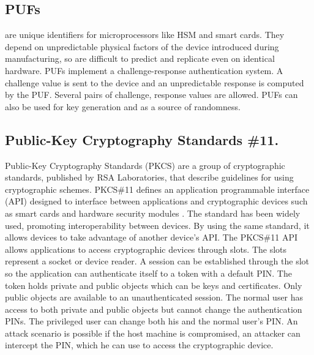 \subsection{PUFs} are unique identifiers for microprocessors like HSM and smart cards. They depend on unpredictable physical factors of the device introduced during manufacturing, so are difficult to predict and replicate even on identical hardware. PUFs implement a challenge-response authentication system. A challenge value is sent to the device and an unpredictable response is computed by the PUF. Several pairs of challenge, response values are allowed. PUFs can also be used for key generation and as a source of randomness. \label{chap:background:PUF}

\subsection{Public-Key Cryptography Standards \#11.}
Public-Key Cryptography Standards (PKCS) are a group of cryptographic standards, published by RSA Laboratories, that describe guidelines for using cryptographic schemes.
PKCS\#11 defines an application programmable interface (API) designed to interface between applications and cryptographic devices such as smart cards and hardware security modules \cite{pkcs11analysis}. 
The standard has been widely used, promoting interoperability between devices. By using the same standard, it allows devices to take advantage of another device's API.
The PKCS\#11 API allows applications to access cryptographic devices through slots. The slots represent a socket or device reader. A session can be established through the slot so the application can authenticate itself to a token with a default PIN. The token holds private and public objects which can be keys and certificates. Only public objects are available to an unauthenticated session. The normal user has access to both private and public objects but cannot change the authentication PINs. The privileged user can change both his and the normal user's PIN.
An attack scenario is possible if the host machine is compromised, an attacker can intercept the PIN, which he can use to access the cryptographic device.
